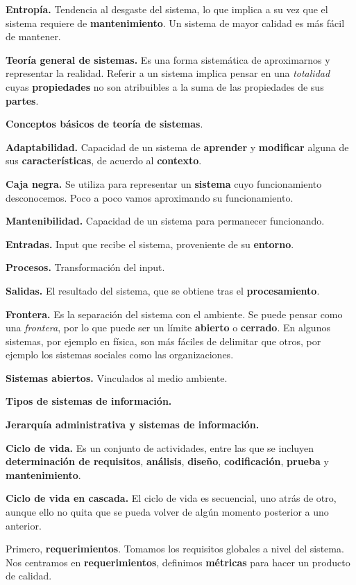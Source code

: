 \documentclass{article}
\begin{document}
\textbf{Entropía.} Tendencia al desgaste del sistema, lo que implica a su vez
que el sistema requiere de \textbf{mantenimiento}. Un sistema de mayor calidad
es más fácil de mantener.

\textbf{Teoría general de sistemas.} Es una forma sistemática de aproximarnos y
representar la realidad. Referir a un sistema implica pensar en una
\textit{totalidad} cuyas \textbf{propiedades }no son atribuibles a la suma de
las propiedades de sus \textbf{partes}.

\textbf{Conceptos básicos de teoría de sistemas}.

\textbf{Adaptabilidad.} Capacidad de un sistema de \textbf{aprender} y
\textbf{modificar} alguna de sus \textbf{características}, de acuerdo al
\textbf{contexto}.

\textbf{Caja negra.} Se utiliza para representar un \textbf{sistema} cuyo
funcionamiento desconocemos. Poco a poco vamos aproximando su funcionamiento.

\textbf{Mantenibilidad.} Capacidad de un sistema para permanecer funcionando.

\textbf{Entradas.} Input que recibe el sistema, proveniente de su
\textbf{entorno}.

\textbf{Procesos.} Transformación del input.

\textbf{Salidas.} El resultado del sistema, que se obtiene tras el
\textbf{procesamiento}.

\textbf{Frontera.} Es la separación del sistema con el ambiente. Se puede pensar
como una \textit{frontera}, por lo que puede ser un límite \textbf{abierto} o
\textbf{cerrado}. En algunos sistemas, por ejemplo en física, son más fáciles de
delimitar que otros, por ejemplo los sistemas sociales como las organizaciones.

\textbf{Sistemas abiertos.} Vinculados al medio ambiente.

\textbf{Tipos de sistemas de información.}

\textbf{Jerarquía administrativa y sistemas de información.}

\textbf{Ciclo de vida.} Es un conjunto de actividades, entre las que se incluyen
\textbf{determinación de requisitos}, \textbf{análisis}, \textbf{diseño},
\textbf{codificación}, \textbf{prueba} y \textbf{mantenimiento}.

\textbf{Ciclo de vida en cascada.} El ciclo de vida es secuencial, uno atrás de
otro, aunque ello no quita que se pueda volver de algún momento posterior a uno
anterior.

Primero, \textbf{requerimientos}. Tomamos los requisitos globales a
nivel del sistema. Nos centramos en \textbf{requerimientos}, definimos
\textbf{métricas} para hacer un producto de calidad.
\end{document}
